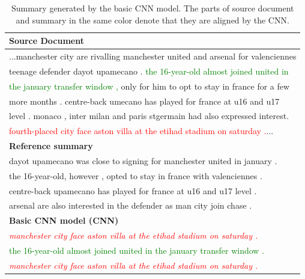 \begin{table}[th!]
\centering
\caption{Summary generated by the basic CNN model. 
	The parts of source document and summary in the same color denote that they are aligned by the CNN.
}
\begin{tabular}{|l|}
\hline \bf Source Document \\
\hline ...manchester city are rivalling manchester united and arsenal for valenciennes \\
       teenage defender dayot upamecano . \textcolor{green}{the 16-year-old almost joined united in} \\
	   \textcolor{green}{the january transfer window ,} only for him to opt to stay in france for a few \\
	   more months . centre-back umecano has played for france at u16 and u17 \\
	   level . monaco , inter milan and paris stgermain had also expressed interest. \\
	   \textcolor{red}{fourth-placed city face aston villa at the etihad stadium on saturday .}...\\
\hline \bf Reference summary \\
\hline dayot upamecano was close to signing for manchester united in january . \\
       the 16-year-old, however , opted to stay in france with valenciennes . \\
	   centre-back upamecano has played for france at u16 and u17 level . \\
	   arsenal are also interested in the defender as man city join chase . \\
\hline \bf Basic CNN model (CNN) \\
\hline \textcolor{red}{\textit{manchester city face aston villa at the etihad stadium on saturday .}}\\
       \textcolor{green}{the 16-year-old almost joined united in the january transfer window .}\\
	   \textcolor{red}{\textit{manchester city face aston villa at the etihad stadium on saturday .}}\\
\hline
\end{tabular}
\label{tab:example}
\end{table}


